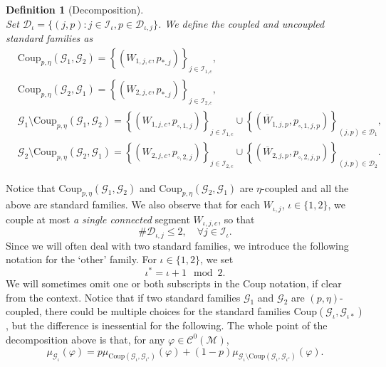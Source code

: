 \documentclass{amsart}
\numberwithin{equation}{section}
\newtheorem{definition}[theorem]{Definition}
\newcommand\vf{\varphi}
\renewcommand{\le}{\leqslant}
\newcommand\cC{{\mathcal C}}
\newcommand\cD{{\mathcal D}}
\newcommand\cG{{\mathcal G}}
\newcommand\cI{{\mathcal I}}
\newcommand\cM{{\mathcal M}}
\newcommand{\Coup}{\text{Coup}}
\begin{document}
\begin{definition}[Decomposition]
\[\]
Set \(\cD_\iota = \{(j,p) : j \in \cI_{\iota}, p \in \cD_{\iota,j}\}\). We define the coupled and uncoupled standard families as
\[
\begin{split}
    &\Coup_{p,\eta}(\cG_1, \cG_2) = \left\{(W_{1,j,c}, p_{*,j})\right\}_{j \in  \cI_{1,c}},\\
    &\Coup_{p,\eta}(\cG_2, \cG_1) = \left\{(W_{2,j,c}, p_{*,j})\right\}_{j \in  \cI_{2,c}},\\
    &\cG_1 \setminus \Coup_{p,\eta}(\cG_1, \cG_2) = \left\{(W_{1,j,c}, p_{\square, 1, j})\right\}_{j \in \cI_{1,c}} \cup \left\{(\overline W_{1,j,p}, p_{\square,1,j,p})\right\}_{(j,p) \in \cD_1},\\
    &\cG_2 \setminus \Coup_{p,\eta}(\cG_2, \cG_1) = \left\{(W_{2,j,c}, p_{\square, 2, j})\right\}_{j  \in \cI_{2,c}} \cup \left\{(\overline W_{2,j,p}, p_{\square,2,j,p})\right\}_{(j,p) \in \cD_2}.
\end{split}
\]
\end{definition}
Notice that \(\Coup_{p,\eta}(\cG_1, \cG_2)\) and \(\Coup_{p,\eta}(\cG_2, \cG_1)\) are \(\eta\)-coupled and all the above are standard families. We also observe that for each \(W_{\iota,j}\), \(\iota \in \{1,2\}\), we couple at most \textit{a single connected} segment \( W_{\iota ,j,c}\), so that
\begin{equation}\label{eq:number-connected-segments-coupling}
    \# \cD_{\iota, j} \le 2, \quad \forall j \in \cI_\iota.
\end{equation}
Since we will often deal with two standard families, we introduce the following notation for the `other' family. For \(\iota \in \{1,2\}\), we set
\[
    \iota^{*} = \iota +1 \mod 2.
\]
We will sometimes omit one or both subscripts in the \(\Coup\) notation, if clear from the context. Notice that if two standard families \(\cG_1\) and \(\cG_2\) are \((p,\eta)\)-coupled, there could be multiple choices for the standard families \(\Coup(\cG_{\iota}, \cG_{\iota*})\), but the difference is inessential for the following. The whole point of the decomposition above is that, for any \(\vf \in \cC^0(\cM)\),
  \begin{equation}\label{eq:basic-deco}
      \mu_{\cG_\iota}(\vf) = p \mu_{\Coup(\cG_\iota, \cG_{\iota^*})}(\vf) + (1-p)\mu_{\cG_\iota \setminus \Coup(\cG_\iota, \cG_{\iota^*})}(\vf).
  \end{equation}
\end{document}
